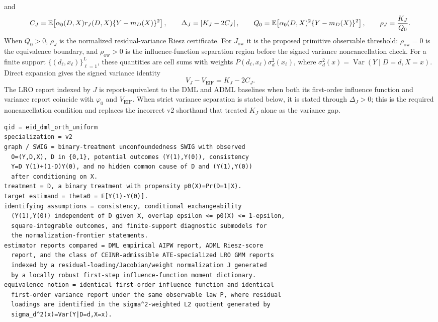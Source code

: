 \documentclass[11pt]{article}
\newcommand{\E}{\mathbb{E}}
\theoremstyle{definition}
\theoremstyle{plain}
\theoremstyle{remark}
\begin{document}
and
\[
  C_J=\E\!\left[\alpha_0(D,X)r_J(D,X)\{Y-m_D(X)\}^2\right],\qquad
  \Delta_J=\left|K_J-2C_J\right|,\qquad
  Q_0=\E\!\left[\alpha_0(D,X)^2\{Y-m_D(X)\}^2\right],
  \qquad
  \rho_J={K_J\over Q_0}.
\]
When $Q_0>0$, $\rho_J$ is the normalized residual-variance Riesz certificate.  For $J_{\mathrm{ow}}$ it is the proposed primitive observable threshold: $\rho_{\mathrm{ow}}=0$ is the equivalence boundary, and $\rho_{\mathrm{ow}}>0$ is the influence-function separation region before the signed variance noncancellation check.
For a finite support $\{(d_\ell,x_\ell)\}_{\ell=1}^L$, these quantities are cell sums with weights $P(d_\ell,x_\ell)\sigma_d^2(x_\ell)$, where $\sigma_d^2(x)=\operatorname{Var}(Y\mid D=d,X=x)$.  Direct expansion gives the signed variance identity
\[
  V_J-V_{\mathrm{EIF}}=K_J-2C_J.
\]
The LRO report indexed by $J$ is report-equivalent to the DML and ADML baselines when both its first-order influence function and variance report coincide with $\varphi_0$ and $V_{\mathrm{EIF}}$.  When strict variance separation is stated below, it is stated through $\Delta_J>0$; this is the required noncancellation condition and replaces the incorrect v2 shorthand that treated $K_J$ alone as the variance gap.

\begin{verbatim}
qid = eid_dml_orth_uniform
specialization = v2
graph / SWIG = binary-treatment unconfoundedness SWIG with observed
  O=(Y,D,X), D in {0,1}, potential outcomes (Y(1),Y(0)), consistency
  Y=D Y(1)+(1-D)Y(0), and no hidden common cause of D and (Y(1),Y(0))
  after conditioning on X.
treatment = D, a binary treatment with propensity p0(X)=Pr(D=1|X).
target estimand = theta0 = E[Y(1)-Y(0)].
identifying assumptions = consistency, conditional exchangeability
  (Y(1),Y(0)) independent of D given X, overlap epsilon <= p0(X) <= 1-epsilon,
  square-integrable outcomes, and finite-support diagnostic submodels for
  the normalization-frontier statements.
estimator reports compared = DML empirical AIPW report, ADML Riesz-score
  report, and the class of CEINR-admissible ATE-specialized LRO GMM reports
  indexed by a residual-loading/Jacobian/weight normalization J generated
  by a locally robust first-step influence-function moment dictionary.
equivalence notion = identical first-order influence function and identical
  first-order variance report under the same observable law P, where residual
  loadings are identified in the sigma^2-weighted L2 quotient generated by
  sigma_d^2(x)=Var(Y|D=d,X=x).
\end{verbatim}
\end{document}
